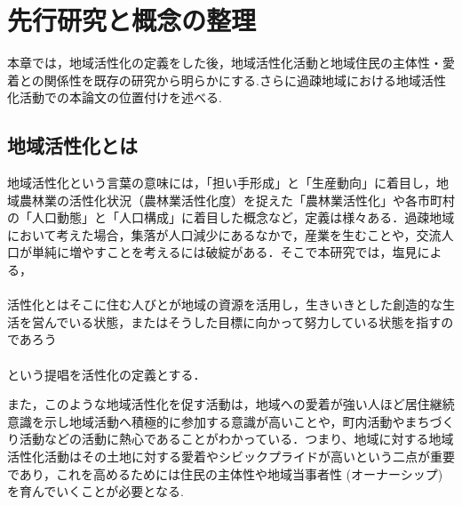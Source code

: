 \documentclass[a4paper]{jsarticle}
\begin{document}
\newpage

\section{先行研究と概念の整理}
本章では，地域活性化の定義をした後，地域活性化活動と地域住民の主体性・愛着との関係性を既存の研究から明らかにする.さらに過疎地域における地域活性化活動での本論文の位置付けを述べる.
\subsection{地域活性化とは}
地域活性化という言葉の意味には，「担い手形成」と「生産動向」に着目し，地域農林業の活性化状況（農林業活性化度）を捉えた「農林業活性化」や各市町村の「人口動態」と「人口構成」に着目した概念など，定義は様々ある．過疎地域において考えた場合，集落が人口減少にあるなかで，産業を生むことや，交流人口が単純に増やすことを考えるには破綻がある．そこで本研究では，塩見による，\\\\
活性化とはそこに住む人びとが地域の資源を活用し，生きいきとした創造的な生活を営んでいる状態，またはそうした目標に向かって努力している状態を指すのであろう\cite{shiomi}\\\\
という提唱を活性化の定義とする．\par
また，このような地域活性化を促す活動は，地域への愛着が強い人ほど居住継続意識を示し地域活動へ積極的に参加する意識が高いことや，町内活動やまちづくり活動などの活動に熱心であること\cite{8}がわかっている．つまり、地域に対する地域活性化活動はその土地に対する愛着やシビックプライドが高いという二点が重要であり，これを高めるためには住民の主体性や地域当事者性 (オーナーシップ) を育んでいくことが必要となる.\par
\end{document}
